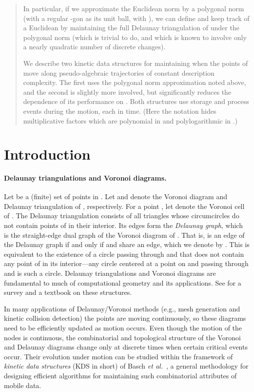 \documentclass[letter,11pt]{article}
\begin{document}
\begin{titlepage}
\begin{abstract}
In particular, if we approximate the Euclidean norm by a polygonal 
norm (with a regular -gon as its unit ball, with
), we can define and keep track of a Euclidean 
by maintaining the full Delaunay triangulation of  under the
polygonal norm (which is trivial to do, and which is known to involve only a
nearly quadratic number of discrete changes).

We describe two kinetic data structures for maintaining  when
the points of  move along pseudo-algebraic trajectories of constant description complexity. The first
uses the polygonal norm approximation noted above, and the second is
slightly more involved, but significantly reduces the dependence of 
its performance on .  Both structures use  storage 
and process  events during the motion, each in  time.
(Here the  notation hides multiplicative factors which 
are polynomial in  and polylogarithmic in .)
\end{abstract}

\end{titlepage}

\section{Introduction}


\paragraph{Delaunay triangulations and Voronoi diagrams.} 
Let  be a (finite) set of points in . 
Let  and  denote the Voronoi diagram and Delaunay
triangulation of , respectively. For a point , let
 denote the Voronoi cell of . 
The Delaunay triangulation  consists of all 
triangles whose circumcircles do not contain points of  in their
interior. Its edges form the {\em Delaunay graph}, which is the 
straight-edge dual graph of the Voronoi diagram of . That is,
 is an edge of the Delaunay graph if and only if
 and  share an edge, which we denote by .
This is equivalent to the existence of a circle passing through 
and  that does not contain any point of  in its interior---any
circle centered at a point on  and passing through  and 
is such a circle. 
Delaunay triangulations and Voronoi diagrams are fundamental to much 
of computational geometry and its applications. 
See \cite{AK,Ed2} for a survey and a
textbook on these structures.

In many applications of Delaunay/Voronoi methods (e.g., mesh generation and kinetic collision detection) the points are moving continuously, so
these diagrams need to be efficiently updated as motion occurs.
Even though the motion of the nodes is continuous, the combinatorial and topological structure of the Voronoi and
Delaunay diagrams change only at
discrete times when certain critical events occur. Their evolution
under motion can be studied within the framework of {\em kinetic data
structures} (KDS in short) of Basch {\em et al.}~\cite{bgh-dsmd-99,285869,g-kdssar-98},
a general methodology for designing efficient algorithms for maintaining
such combinatorial attributes of mobile data. 
\end{document}
